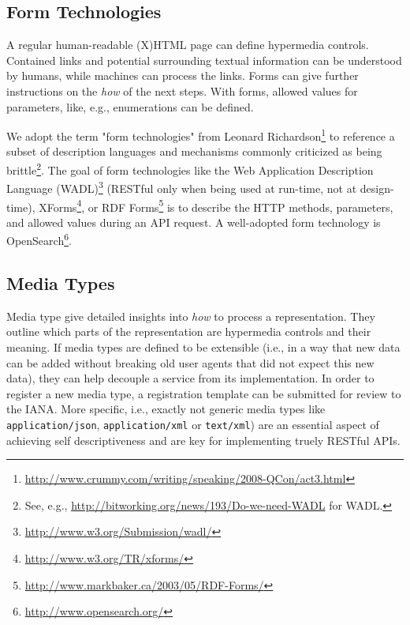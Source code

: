 \documentclass{acm_proc_article-sp}
\begin{document}
\subsection{Form Technologies}\label{sec:formtechs}
A regular human-readable (X)HTML page can define hypermedia controls. Contained links and potential surrounding textual information can be understood by humans, while machines can process the links. Forms can give further instructions on the \textit{how} of the next steps. With forms, allowed values for parameters, like, e.g., enumerations can be defined.

We adopt the term "form technologies" from Leonard Richardson\footnote{\url{http://www.crummy.com/writing/speaking/2008-QCon/act3.html}} to reference a subset of description languages and mechanisms commonly criticized as being brittle\footnote{See, e.g., \url{http://bitworking.org/news/193/Do-we-need-WADL} for WADL.}. The goal of form technologies like the Web Application Description Language (WADL)\footnote{\url{http://www.w3.org/Submission/wadl/}} (RESTful only when being used at run-time, not at design-time), XForms\footnote{\url{http://www.w3.org/TR/xforms/}}, or RDF Forms\footnote{\url{http://www.markbaker.ca/2003/05/RDF-Forms/}} is to describe the HTTP methods, parameters, and allowed values during an API request. A well-adopted form technology is OpenSearch\footnote{\url{http://www.opensearch.org/}}.

\subsection{Media Types}\label{sec:mediatypes}
Media type give detailed insights into \textit{how} to process a representation. They outline which parts of the representation are hypermedia controls and their meaning. If media types are defined to be extensible (i.e., in a way that new data can be added without breaking old user agents that did not expect this new data), they can help decouple a service from its implementation. In order to register a new media type, a registration template can be submitted for review to the IANA. More specific, i.e., exactly not generic media types like \texttt{application/json}, \texttt{application/xml} or \texttt{text/xml}) are an essential aspect of achieving self descriptiveness and are key for implementing truely RESTful APIs.
\end{document}
